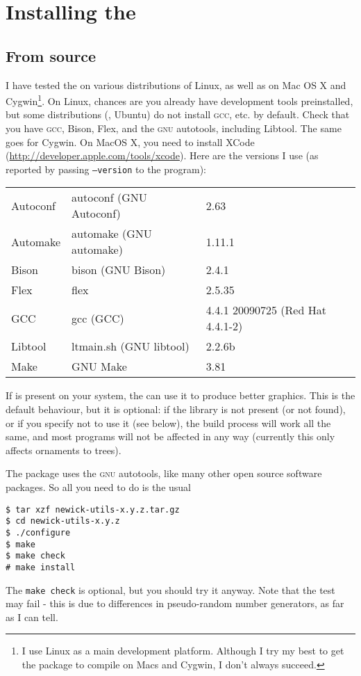 \chapter{Installing the \nutils}
\label{app:installing}

\section{From source}

I have tested the \nutils{} on various distributions of Linux, as well as on
Mac OS X and Cygwin\footnote{I use Linux as a main development platform.
Although I try my best to get the package to compile on Macs and Cygwin, I don't
always succeed.}. On Linux, chances are you already have development tools
preinstalled, but some distributions (\eg, Ubuntu) do not install \textsc{gcc},
etc. by default. Check that you have \textsc{gcc}, Bison, Flex, and the
\textsc{gnu} autotools, including Libtool. The same goes for Cygwin. On MacOS X,
you need to install XCode (\url{http://developer.apple.com/tools/xcode}).
Here are the versions I use (as reported by passing \texttt{--version} to the
program):

\medskip
\begin{tabular}{lll}
Autoconf	& autoconf (GNU Autoconf) & 2.63 \\
Automake	& automake (GNU automake) & 1.11.1 \\
Bison  		& bison (GNU Bison) 			& 2.4.1 \\ 
Flex			& flex 										& 2.5.35 \\
GCC 			& gcc (GCC) 							& 4.4.1 20090725 (Red Hat 4.4.1-2) \\
Libtool		& ltmain.sh (GNU libtool) & 2.2.6b \\
Make			& GNU Make 								& 3.81
\end{tabular}
\medskip

\noindent{}If \libxml{} is present on your system, the \nutils{} can use it to
produce better \svg{} graphics. This is the default behaviour, but it is
optional: if the library is not present (or not found), or if you specify not to
use it (see below), the build process will work all the same, and most programs
will not be affected in any way (currently this only affects ornaments to \svg{}
trees).

\noindent{}The package uses the \textsc{gnu} autotools, like many other open source
software packages. So all you need to do is the usual
\begin{verbatim}
$ tar xzf newick-utils-x.y.z.tar.gz
$ cd newick-utils-x.y.z
$ ./configure
$ make
$ make check
# make install
\end{verbatim}
The \texttt{make check} is optional, but you should try it anyway. Note that
the \gen{} test may fail - this is due to differences in pseudo-random number
generators, as far as I can tell.

